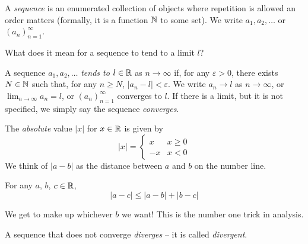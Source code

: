 \documentclass{../../template/note}
\begin{document}
    \begin{definition}
        A \emph{sequence} is an enumerated collection of objects where repetition is allowed an order matters (formally, it is a function \(\mathbb N\) to some set). We write \(a_1, a_2, \dots\) or \((a_n)_{n=1}^\infty\).
    \end{definition}
    
    What does it mean for a sequence to tend to a limit \(l\)?

    \begin{definition}
        A sequence \(a_1, a_2, \dots\) \emph{tends to} \(l \in \mathbb R\) as \(n \to \infty\) if, for any \(\varepsilon > 0\), there exists \(N \in \mathbb N\) such that, for any \(n \geq N\), \(|a_n - l| < \varepsilon\). We write \(a_n \to l\) as \(n \to \infty\), or \(\lim_{n \to \infty} a_n = l\), or \((a_n)_{n=1}^\infty\) converges to \(l\). If there is a limit, but it is not specified, we simply say the sequence \emph{converges}.
    \end{definition}
    
    \begin{definition}
        The \emph{absolute} value \(|x|\) for \(x \in \mathbb R\) is given by
        \[  
            |x| = \begin{cases}
                x & x \geq 0 \\
                -x & x < 0
            \end{cases}
        \]
        We think of \(|a-b|\) as the distance between \(a\) and \(b\) on the number line.
    \end{definition}
    
    \begin{theorem}
        For any \(a\), \(b\), \(c \in \mathbb R\),
        \[
            |a-c| \leq |a-b| + |b-c|
        \]
    \end{theorem}
    
    \begin{remark*}
        We get to make up whichever \(b\) we want! This is the number one trick in analysis.
    \end{remark*}
    
    \begin{definition}
        A sequence that does not converge \emph{diverges} -- it is called \emph{divergent}.
    \end{definition}
    
\end{document}
